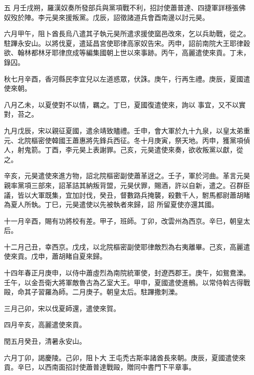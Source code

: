 \begin{pinyinscope}
 五
 月壬戌朔，羅漢奴奏所發部兵與黨項戰不利，招討使蕭普達、四捷軍詳穩張佛奴歿於陣。李元昊來援叛黨。戊辰，詔徵諸道兵會酉南邊以討元昊。



 六月甲午，阻卜酋長烏八遣其子執元昊所遣求援使窳邑改來，乞以兵助戰，從之。駐蹕永安山。以將伐夏，遣延昌宮使耶律高家奴告宋。丙申，詔前南院大王耶律穀欲、翰林都林牙耶律庶成等編集國朝上世以來事跡。丙午，高麗遣使來貢。丁未，錄囚。



 秋七月辛酉，香河縣民李宜兒以左道惑眾，伏誅。庚午，行再生禮。庚辰，夏國遣使來朝。



 八月乙未，以夏使對不以情，羈之。丁巳，夏國復遣使來，詢以
 事宜，又不以實對，苔之。



 九月戊辰，宋以親征夏國，遣余靖致贐禮。壬申，會大軍於九十九泉，以皇太弟重元、北院樞密使韓國王蕭惠將先鋒兵西征。冬十月庚寅，祭天地。丙申，獲黨項偵人，射鬼箭。丁酉，李元昊上表謝罪。己亥，元昊遣使來奏，欲收叛黨以獻，從之。



 辛亥，元昊遣使來進方物，詔北院樞密副使蕭革迓之。壬子，軍於河曲。革言元昊親率黨項三部來，詔革詰其納叛背盟，元昊伏罪，賜酒，許以自新，遣之。召群臣議，皆以大軍既集，宜加討伐，癸丑，督數路兵掩襲，殺數千人，駙馬都尉蕭胡睹為夏人所執。丁巳，元昊遣使以先被執者來歸，詔
 所留夏使亦還其國。



 十一月辛酉，賜有功將校有差。甲子，班師。丁卯，改雲州為西京。辛巳，朝皇太后。



 十二月己丑，幸西京。戊戌，以北院樞密副使耶律敵烈為右夷離畢。己亥，高麗遣使來貢。戊申，蕭胡睹自夏來歸。



 十四年春正月庚申，以侍中蕭虛烈為南院統軍使，封遼西郡王。庚午，如鴛鴦濼。壬午，以金吾衛大將軍敵魯古為乙室大王。甲申，夏國遣使進鶻。以常侍斡古得戰毆，命其子習羅為師。二月庚子。朝皇太后。駐蹕撒刺濼。



 三月己卯，宋以伐夏師還，遣使來賀。



 四月辛亥，高麗遣使來貢。



 閏五月癸丑，清暑永安山。



 六月丁卯，謁慶陵。己卯，阻卜大
 王屯禿古斯率諸酋長來朝。庚辰，夏國遣使來貢。辛巳，以西南面招討使蕭普達戰毆，贈同中書門下平章事。




\end{pinyinscope}
